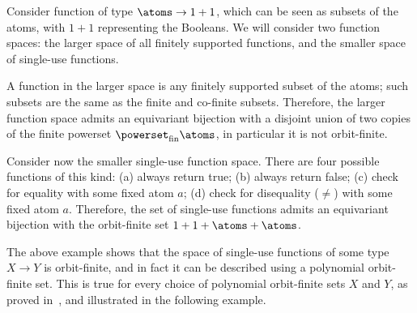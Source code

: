 \begin{example}\label{ex:first-single-use-function-space}
    Consider function of type $\atoms \to 1 + 1$, which can be seen as subsets of the atoms, with $1+1$ representing the Booleans. We will consider two function spaces: the larger space of all finitely supported functions, and the smaller space of single-use functions.
    
    A function in the larger space is any finitely supported subset of the atoms; such subsets are the same as the finite and co-finite subsets. Therefore, the larger function space admits an equivariant bijection with a disjoint union of two copies of the finite powerset $\powerset_{\text{fin}} \atoms$, in particular it is not orbit-finite.
    
    Consider now the smaller single-use function space. There are four possible functions of this kind: (a) always return true; (b) always return false; (c) check for equality with some fixed atom $a$; (d) check for disequality ($\neq$) with some fixed atom $a$.  Therefore,  the set of single-use functions  admits an equivariant bijection with the orbit-finite set $1 + 1 + \atoms + \atoms$.
    \exampleend
\end{example}


The above example shows that the space of single-use functions of some type $X \to Y$ is orbit-finite, and in fact it can be described using a polynomial orbit-finite set. This is true for every choice of polynomial orbit-finite sets $X$ and $Y$, as proved in~\cite[Theorem 5]{stefanski-phd}, and illustrated in the following example. 


